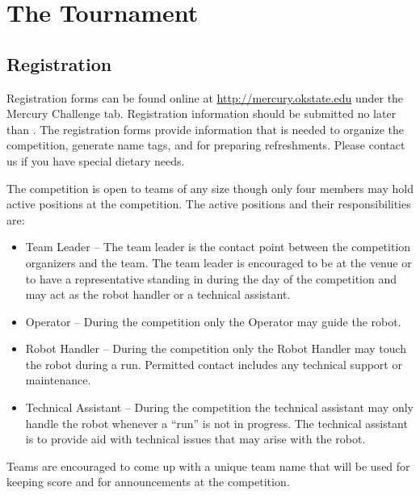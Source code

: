 \section{The Tournament}
\subsection{Registration}
Registration forms can be found online at \url{http://mercury.okstate.edu} under the Mercury Challenge tab. Registration information should be submitted no later than \textbf{\registration}. The registration forms provide information that is needed to organize the competition, generate name tags, and for preparing refreshments. Please contact us if you have special dietary needs.

The competition is open to teams of any size though only four members may hold active positions at the competition. The active positions and their responsibilities are:

\begin{itemize}
\item Team Leader – The team leader is the contact point between the competition organizers and the team. The team leader is encouraged to be at the venue or to have a representative standing in during the day of the competition and may act as the robot handler or a technical assistant.
\item Operator – During the competition only the Operator may guide the robot.  
\item Robot Handler – During the competition only the Robot Handler may touch the robot during a run. Permitted contact includes any technical support or maintenance.
\item Technical Assistant – During the competition the technical assistant may only handle the robot whenever a “run” is not in progress. The technical assistant is to provide aid with technical issues that may arise with the robot.
\end{itemize}

Teams are encouraged to come up with a unique team name that will be used for keeping score and for announcements at the competition. 

